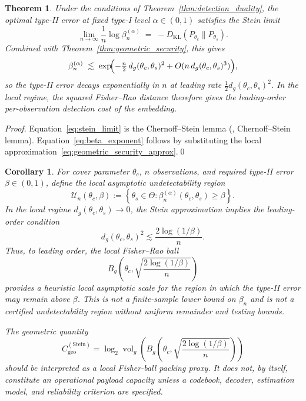 \documentclass[a4paper,fleqn]{cas-dc}
\newtheorem{theorem}{Theorem}
\newtheorem{corollary}{Corollary}
\DeclareMathOperator{\vol}{vol}
\newcommand{\DKL}{D_{\mathrm{KL}}}
\begin{document}
\begin{theorem}%
\label{thm:stein_exponent}
Under the conditions of Theorem~\ref{thm:detection_duality}, the optimal
type-II error at fixed type-I level $\alpha\in(0,1)$ satisfies the Stein limit
\begin{equation}
  \lim_{n\to\infty}\frac{1}{n}\log\beta_n^{(\alpha)}
  \;=\;-\DKL(P_{\theta_c}\|P_{\theta_s}).
  \label{eq:stein_limit}
\end{equation}
Combined with Theorem~\ref{thm:geometric_security}, this gives
\begin{equation}
  \beta_n^{(\alpha)}
  \;\lesssim\;
  \exp\!\Bigl(-\tfrac{n}{2}\,d_g(\theta_c,\theta_s)^2
              + O(n\,d_g(\theta_c,\theta_s)^3)\Bigr),
  \label{eq:beta_exponent}
\end{equation}
so the type-II error decays exponentially in $n$ at leading rate
$\frac{1}{2}d_g(\theta_c,\theta_s)^2$.
In the local regime, the squared Fisher--Rao distance therefore gives the
leading-order per-observation detection cost of the embedding.
\end{theorem}

\begin{proof}
Equation~\eqref{eq:stein_limit} is the Chernoff--Stein lemma
(\cite{cover2006elements}, Chernoff--Stein lemma).
Equation~\eqref{eq:beta_exponent} follows by substituting the local
approximation~\eqref{eq:geometric_security_approx}.\qed
\end{proof}

\begin{corollary}
\label{cor:undetectable_ball}
For cover parameter $\theta_c$, $n$ observations, and required type-II
error $\beta\in(0,1)$, define the local asymptotic undetectability region
\[
  \mathcal{U}_n(\theta_c,\beta)
  :=
  \left\{
    \theta_s\in\Theta :
    \beta_n^{(\alpha)}(\theta_c,\theta_s)\geq\beta
  \right\}.
\]
In the local regime $d_g(\theta_c,\theta_s)\to 0$, the Stein approximation
implies the leading-order condition
\[
  d_g(\theta_c,\theta_s)^2
  \lesssim
  \frac{2\log(1/\beta)}{n}.
\]
Thus, to leading order, the local Fisher--Rao ball
\[
  B_g\!\left(
    \theta_c,\sqrt{\frac{2\log(1/\beta)}{n}}
  \right)
\]
provides a heuristic local asymptotic scale for the region in which
the type-II error may remain above $\beta$. This is not a
finite-sample lower bound on $\beta_n$ and is not a certified
undetectability region without uniform remainder and testing bounds.

The geometric quantity
\[
C_{\mathrm{geo}}^{(\mathrm{Stein})}
=
\log_2\vol_g\!\left(
B_g\!\left(
\theta_c,\sqrt{\frac{2\log(1/\beta)}{n}}
\right)
\right)
\]
should be interpreted as a local Fisher-ball packing proxy. It does not,
by itself, constitute an operational payload capacity unless a codebook,
decoder, estimation model, and reliability criterion are specified.
\end{corollary}
\end{document}
